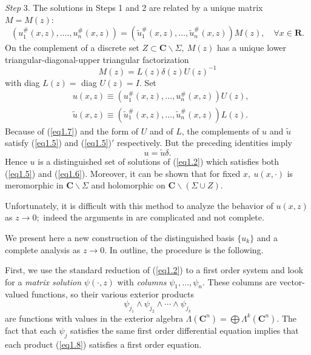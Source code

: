 \documentclass{surv-l}
\theoremstyle{plain}
\theoremstyle{definition}
\numberwithin{equation}{chapter}
\begin{document}
\emph{Step} 3. The solutions in Steps 1 and 2 are related by a unique matrix $M= M(z)$:
\begin{equation*}
(u_{1}^{\#}(x,z),\ldots.,u_{n}^{\#}(x,z))=(\tilde{u}_{1}^{\#}(x, z), \ldots,\tilde{u}_{n}^{\#}(x, z))M(z),\quad \forall x\in \mathbf{R}.
\end{equation*}
On the complement of a discrete set $ Z\subset \mathbf{C}\backslash \Sigma,\ M(z)$ has a unique lower triangular-diagonal-upper triangular factorization
\begin{equation*}
M(z)=L(z)\delta(z)U(z)^{-1}
\end{equation*}
with diag $L(z)=$ diag $U(z)=I$. Set
\begin{align*}
&u(x,z)\equiv(u_{1}^{\#}(x, z), \ldots , u_{n}^{\#}(x, z))U(z),\\
&\tilde{u}(x, z)\equiv(\tilde{u}_{1}^{\#}(x, z),\ldots,\tilde{u}_{n}^{\#}(x, z))L(z).
\end{align*}
Because of (\ref{eq1.7}) and the form of $U$ and of $L$, the complements of $u$ and $\tilde{u}$ satisfy (\ref{eq1.5}) and (\ref{eq1.5})$'$  respectively. But the preceding identities imply
\begin{equation*}
u=\tilde{u}\delta.
\end{equation*}
Hence $u$ is a distinguished set of solutions of (\ref{eq1.2}) which satisfies both (\ref{eq1.5}) and (\ref{eq1.6}). Moreover, it can be shown that for fixed $x,\ u(x,\cdot)$ is meromorphic in $ \mathbf{C}\backslash \Sigma$ and holomorphic on $\mathbf{C}\backslash (\Sigma\cup Z)$.

Unfortunately, it is difficult with this method to analyze the behavior of $u(x, z)$ as $z\rightarrow 0;$ indeed the arguments in \cite{Be} are complicated and not complete.

We present here a new construction of the distinguished basis $\{u_{k}\}$ and a complete analysis as $z\rightarrow 0$. In outline, the procedure is the following.

First, we use the standard reduction of (\ref{eq1.2}) to a first order system and look for a \emph{matrix solution} $\psi(\cdot, z)$ with \emph{columns} $\psi_{1},\ldots, \psi_{n}$. These columns are vector-valued functions, so their various exterior products
\begin{equation}\label{eq1.8}
\psi_{j_{1}}\wedge\psi_{j_{2}}\wedge\cdots \wedge\psi_{j_{k}}
\end{equation}
are functions with values in the exterior algebra $\Lambda(\mathbf{C}^{n})=\bigoplus\Lambda^{k}(\mathbf{C}^{n})$. The fact that each $\psi_{j}$ satisfies the same first order differential equation implies that each product (\ref{eq1.8}) satisfies a first order equation.
\end{document}

